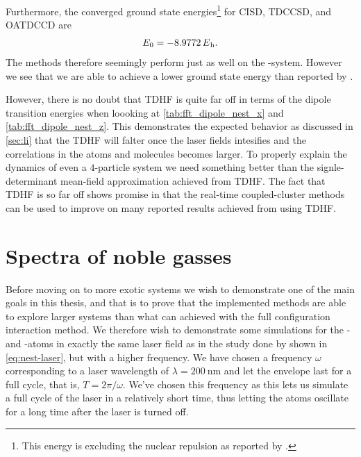         Furthermore, the converged ground state energies\footnote{%
            This energy is excluding the nuclear repulsion as reported by
            \citeauthor{nest} \cite{nest}.
        } for CISD, TDCCSD, and OATDCCD are
        \begin{align}
            \energy_0 = \SI{-8.9772}{\hartree}.
        \end{align}
        The methods therefore seemingly perform just as well on the
        -system.
        However we see that we are able to achieve a lower ground state energy than
        reported by \citeauthor{nest}.

        However, there is no doubt that TDHF is quite far off in terms of the
        dipole transition energies when loooking at
        \autoref{tab:fft_dipole_nest_x} and \autoref{tab:fft_dipole_nest_z}.
        This demonstrates the expected behavior as discussed in \autoref{sec:li}
        that the TDHF will falter once the laser fields intesifies and the
        correlations in the atoms and molecules becomes larger.
        To properly explain the dynamics of even a $4$-particle system we need
        something better than the signle-determinant mean-field approximation
        achieved from TDHF.
        The fact that TDHF is so far off shows promise in that the real-time
        coupled-cluster methods can be used to improve on many reported results
        achieved from using TDHF.


    \section{Spectra of noble gasses}
        \label{sec:noble-gasses}
        Before moving on to more exotic systems we wish to demonstrate one of
        the main goals in this thesis, and that is to prove that the implemented
        methods are able to explore larger systems than what can achieved with
        the full configuration interaction method.
        We therefore wish to demonstrate some simulations for the - and
        -atoms in exactly the same laser field as in the study done by
        \citeauthor{nest} \cite{nest} shown in \autoref{eq:nest-laser}, but with
        a higher frequency.
        We have chosen a frequency $\omega$ corresponding to a laser wavelength
        of $\lambda = \SI{200}{\nm}$ and let the envelope last for a full cycle,
        that is, $T = 2\pi / \omega$.
        We've chosen this frequency as this lets us simulate a full cycle of the
        laser in a relatively short time, thus letting the atoms oscillate for a
        long time after the laser is turned off.

